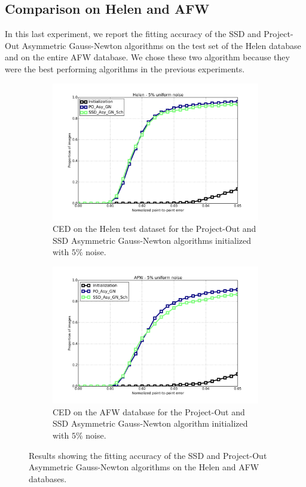\subsection{Comparison on Helen and AFW}

In this last experiment, we report the fitting accuracy of the SSD and Project-Out Asymmetric Gauss-Newton algorithms on the test set of the Helen database and on the entire AFW database. We chose these two algorithm because they were the best performing algorithms in the previous experiments. 

\begin{figure}[h!]
	\centering
	\begin{subfigure}{0.48\textwidth}
	    \includegraphics[width=\textwidth]{experiments/best/ced_helen_5.png}
	    \caption{CED on the Helen test dataset for the Project-Out and SSD Asymmetric Gauss-Newton algorithms initialized with $5\%$ noise.}
	    \label{fig:ced_po_for_gn}
	\end{subfigure}
	\hfill
	\begin{subfigure}{0.48\textwidth}
	    \includegraphics[width=\textwidth]{experiments/best/ced_afw_5.png}
	    \caption{CED on the AFW database for the Project-Out and SSD Asymmetric Gauss-Newton algorithm initialized with $5\%$ noise.}
	    \label{fig:ced_po_inv_gn}
	\end{subfigure}
	\caption{Results showing the fitting accuracy of the SSD and Project-Out Asymmetric Gauss-Newton algorithms on the Helen and AFW databases.}
	\label{fig:helen_afw}
\end{figure}

